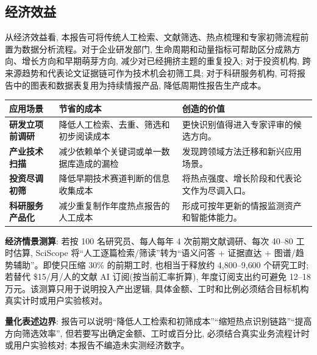 \subsection{经济效益}

从经济效益看, 本报告可将传统人工检索、文献筛选、热点梳理和专家初筛流程前置为数据分析流程。对于企业研发部门, 生命周期和动量指标可帮助区分成熟方向、增长方向和早期萌芽方向, 减少对已经拥挤主题的重复投入; 对于投资机构, 跨来源趋势和代表论文证据链可作为技术机会初筛工具; 对于科研服务机构, 可将报告中的图表和数据表复用为持续情报产品, 降低周期性报告生产成本。

\begin{tableblock}
\begin{tabularx}{\textwidth}{>{\bfseries}p{32mm}X X}
\toprule
应用场景 & 节省的成本 & 创造的价值 \\
\midrule
研发立项前调研 & 降低人工检索、去重、筛选和初步阅读成本 & 更快识别值得进入专家评审的候选方向。 \\
产业技术扫描 & 减少依赖单个关键词或单一数据库造成的漏检 & 发现跨领域方法迁移和新兴应用场景。 \\
投资尽调初筛 & 降低早期技术赛道判断的信息收集成本 & 将热点强度、增长阶段和代表论文作为尽调入口。 \\
科研服务产品化 & 减少重复制作年度热点报告的人工成本 & 形成可按年更新的情报监测资产和智能体能力。 \\
\bottomrule
\end{tabularx}
\end{tableblock}

\begin{methodnote}
\textbf{经济情景测算}: 若按 100 名研究员、每人每年 4 次前期文献调研、每次 40--80 工时估算, SciScope 将“人工逐篇检索/筛读”转为“语义问答 + 证据直达 + 图谱/趋势辅助”。即使只压缩 30\% 的前期工时, 也相当于释放约 4{,}800--9{,}600 个研究工时; 若替代 \$15/月/人的文献 AI 订阅(按当前汇率折算), 年度订阅支出约可避免 12--18 万元。该测算只用于说明投入产出逻辑, 具体金额、工时和比例必须结合目标机构真实计时或用户实验核对。
\end{methodnote}

\begin{methodnote}
\textbf{量化表述边界}: 报告可以说明“降低人工检索和初筛成本”“缩短热点识别链路”“提高方向筛选效率”, 但若要写出确定金额、工时或百分比, 必须结合真实业务流程计时或用户实验核对; 本报告不编造未实测经济数字。
\end{methodnote}

